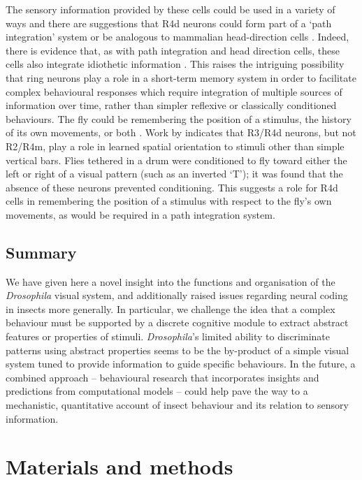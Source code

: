 \documentclass[10pt]{article}
\begin{document}
The sensory information provided by these cells could be used in a variety of ways and there are suggestions that R4d neurons could form part of a ‘path integration’ system \cite{Neuser2008} or be analogous to mammalian head-direction cells \cite{Tomchik2008}. Indeed, there is evidence that, as with path integration and head direction cells, these cells also integrate idiothetic information \cite{Zars2009}. This raises the intriguing possibility that ring neurons play a role in a short-term memory system in order to facilitate complex behavioural responses which require integration of multiple sources of information over time, rather than simpler reflexive or classically conditioned behaviours. The fly could be remembering the position of a stimulus, the history of its own movements, or both \cite{Tomchik2008}. Work by \cite{Guo2015} indicates that R3/R4d neurons, but not R2/R4m, play a role in learned spatial orientation to stimuli other than simple vertical bars. Flies tethered in a drum were conditioned to fly toward either the left or right of a visual pattern (such as an inverted ‘T’); it was found that the absence of these neurons prevented conditioning. This suggests a role for R4d cells in remembering the position of a stimulus with respect to the fly’s own movements, as would be required in a path integration system. 

\subsection*{Summary}
We have given here a novel insight into the functions and organisation of the \emph{Drosophila} visual system, and additionally raised issues regarding neural coding in insects more generally. In particular, we challenge the idea that a complex behaviour must be supported by a discrete cognitive module to extract abstract features or properties of stimuli. \emph{Drosophila}’s limited ability to discriminate patterns using abstract properties seems to be the by-product of a simple visual system tuned to provide information to guide specific behaviours. In the future, a combined approach – behavioural research that incorporates insights and predictions from computational models – could help pave the way to a mechanistic, quantitative account of insect behaviour and its relation to sensory information.

\section*{Materials and methods}
\end{document}
